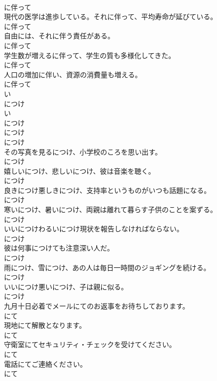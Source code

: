 \documentclass[8pt]{extreport}
\begin{document}
\begin{CJK}{UTF8}{min}
\\	に伴って	
\\	現代の医学は進歩している。それに伴って、平均寿命が延びている。	
\\	に伴って	
\\	自由には、それに伴う責任がある。	
\\	に伴って	
\\	学生数が増えるに伴って、学生の質も多様化してきた。	
\\	に伴って	
\\	人口の増加に伴い、資源の消費量も増える。	
\\	に伴って	
\\	い
\\	につけ 
\\	い
\\	につけ 
\\	につけ 
\\	につけ	
\\	その写真を見るにつけ、小学校のころを思い出す。	
\\	につけ	
\\	嬉しいにつけ、悲しいにつけ、彼は音楽を聴く。	
\\	につけ	
\\	良きにつけ悪しきにつけ、支持率というものがいつも話題になる。	
\\	につけ	
\\	寒いにつけ、暑いにつけ、両親は離れて暮らす子供のことを案ずる。	
\\	につけ	
\\	いいにつけわるいにつけ現状を報告しなければならない。	
\\	につけ	
\\	彼は何事につけても注意深い人だ。	
\\	につけ	
\\	雨につけ、雪につけ、あの人は毎日一時間のジョギングを続ける。	
\\	につけ	
\\	いいにつけ悪いにつけ、子は親に似る。	
\\	につけ	
\\	九月十日必着でメールにてのお返事をお待ちしております。	
\\	にて	
\\	現地にて解散となります。	
\\	にて	
\\	守衛室にてセキュリティ・チェックを受けてください。	
\\	にて	
\\	電話にてご連絡ください。	
\\	にて	

\end{CJK}
\end{document}
